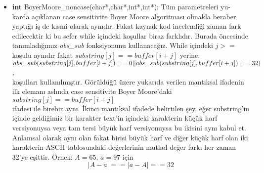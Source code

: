 \documentclass[11pt]{article}
\begin{document}
\begin{itemize}
	\item \textbf{int} \textsf{BoyerMoore\_noncase(char*,char*,int*,int*):} 
	Tüm parametreleri yu-\\karda açıklanan case sensitivite Boyer Moore
	algoritması olmakla beraber yaptığı iş de kısmi olarak aynıdır. Fakat 
	kaynak kod incelendiği zaman fark edilecektir ki bu sefer while içindeki
	koşullar biraz farklıdır. Burada öncesinde tanımladığımız
	\textit{abs\_sub} fonksiyonunu kullanacağız. While içindeki $j>=$ 
	koşulu aynıdır fakat $substring[j] == buffer[i+j]$ yerine, \\ $abs			 	\_sub(substring[j], buffer[i+j]) == 0 \\ || \\abs\_sub(substring[j],buffer[i		    +j])==32)$,
	\\
	koşulları kullanılmıştır. Görüldüğü üzere yukarıda verilen mantıksal     		ifadenin ilk elemanı aslında case sensitivite Boyer Moore'daki \\
    $substring[j] == buffer[i+j]$ \\
    ifadesi ile birebir aynı. İkinci mantıksal ifadede belirtilen şey, eğer
    substring'in içinde geldiğimiz bir karakter text'in içindeki karakterin
    küçük harf versiyonuysa veya tam tersi büyük harf versiyonuysa bu ikisini
    aynı kabul et. Anlamsal olarak aynı olan fakat birisi büyük harf ve
    diğer küçük harf olan iki karakterin ASCII tablosundaki değerlerinin 
    mutlad değer farkı her zaman 32'ye eşittir. Örnek: $A=65$, $a=97$ için 
    $$|A - a| == |a - A| == 32$$
    

\end{itemize}
\end{document}
